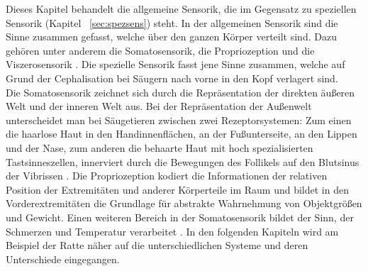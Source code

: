 Dieses Kapitel behandelt die allgemeine Sensorik,  die im Gegensatz zu speziellen Sensorik (Kapitel~ \ref{sec:spezsens}) steht. In der allgemeinen Sensorik sind die Sinne zusammen gefasst, welche über den ganzen Körper verteilt sind. Dazu gehören unter anderem die Somatosensorik, die Propriozeption und die Viszerosensorik  \textsuperscript{\cite[Kap.~22]{kandel2013principles}}. Die spezielle Sensorik  fasst jene Sinne zusammen, welche auf Grund der Cephalisation bei Säugern nach vorne in den Kopf verlagert sind.
\\
\noindent
Die Somatosensorik zeichnet sich durch die Repräsentation der direkten äußeren Welt und der inneren Welt aus. Bei der Repräsentation der Außenwelt unterscheidet man bei Säugetieren zwischen zwei Rezeptorsystemen: Zum einen die haarlose Haut in den Handinnenflächen, an der Fußunterseite, an den Lippen und der Nase, zum anderen die behaarte Haut mit hoch spezialisierten Tastsinneszellen, innerviert durch die Bewegungen des Follikels auf den Blutsinus  der Vibrissen  \textsuperscript{\cite[Kap.~24]{paxinos2014rat}}.
Die Propriozeption kodiert die Informationen der relativen Position der Extremitäten und anderer Körperteile im Raum und bildet in den Vorderextremitäten die Grundlage für abstrakte Wahrnehmung von Objektgrößen und Gewicht. Einen weiteren Bereich in der Somatosensorik bildet der Sinn, der Schmerzen und Temperatur verarbeitet \textsuperscript{\cite[Kap.~24]{paxinos2014rat}}.
In den folgenden Kapiteln wird am Beispiel der Ratte näher auf die unterschiedlichen Systeme und deren Unterschiede eingegangen.

